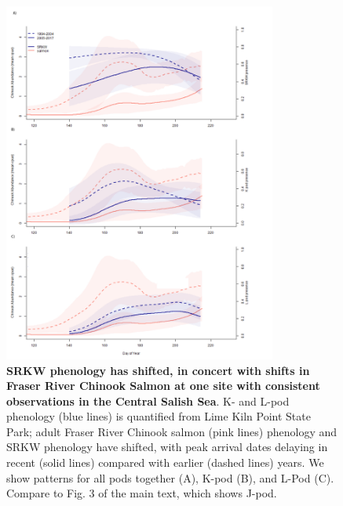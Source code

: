 \documentclass{article}
\begin{document}
\begin{figure}[p]
\includegraphics[width=0.8\textwidth]{../analyses/orcaphen/figures/orcachinphenoverlapKL2005.png}
\caption{\textbf{SRKW phenology has shifted, in concert with shifts in Fraser River Chinook Salmon at one site with consistent observations in the Central Salish Sea}. K- and L-pod phenology (blue lines) is quantified from Lime Kiln Point State Park; adult Fraser River Chinook salmon (pink lines) phenology and SRKW phenology have shifted, with peak arrival dates delaying in recent (solid lines) compared with earlier (dashed lines) years. We show patterns for all pods together (A), K-pod (B), and L-Pod (C). Compare to Fig. 3 of the main text, which shows J-pod. }
\label{fig:KLchin}
\end{figure}
\end{document}
